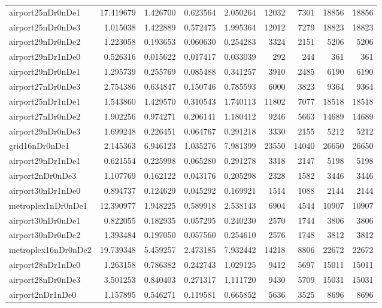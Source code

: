 \begin{longtable}{|l|r|r|r|r|r|r|r|r|}
airport25nDr0nDe1 & 17.419679 & 1.426700 & 0.623564 & 2.050264 & 12032 & 7301 & 18856 & 18856 \\
airport25nDr0nDe3 & 1.015038 & 1.422889 & 0.572475 & 1.995364 & 12012 & 7279 & 18823 & 18823 \\
airport29nDr0nDe2 & 1.223058 & 0.193653 & 0.060630 & 0.254283 & 3324 & 2151 & 5206 & 5206 \\
airport29nDr1nDe0 & 0.526316 & 0.015622 & 0.017417 & 0.033039 & 292 & 244 & 361 & 361 \\
airport29nDr0nDe1 & 1.295739 & 0.255769 & 0.085488 & 0.341257 & 3910 & 2485 & 6190 & 6190 \\
airport27nDr0nDe3 & 2.754386 & 0.634847 & 0.150746 & 0.785593 & 6000 & 3823 & 9364 & 9364 \\
airport25nDr1nDe1 & 1.543860 & 1.429570 & 0.310543 & 1.740113 & 11802 & 7077 & 18518 & 18518 \\
airport27nDr0nDe2 & 1.902256 & 0.974271 & 0.206141 & 1.180412 & 9246 & 5663 & 14689 & 14689 \\
airport29nDr0nDe3 & 1.699248 & 0.226451 & 0.064767 & 0.291218 & 3330 & 2155 & 5212 & 5212 \\
grid16nDr0nDe1 & 2.145363 & 6.946123 & 1.035276 & 7.981399 & 23550 & 14040 & 26650 & 26650 \\
airport29nDr1nDe1 & 0.621554 & 0.225998 & 0.065280 & 0.291278 & 3318 & 2147 & 5198 & 5198 \\
airport2nDr0nDe3 & 1.107769 & 0.162122 & 0.043176 & 0.205298 & 2328 & 1582 & 3446 & 3446 \\
airport30nDr1nDe0 & 0.894737 & 0.124629 & 0.045292 & 0.169921 & 1514 & 1088 & 2144 & 2144 \\
metroplex1nDr0nDe1 & 12.390977 & 1.948225 & 0.589918 & 2.538143 & 6904 & 4544 & 10907 & 10907 \\
airport30nDr0nDe1 & 0.822055 & 0.182935 & 0.057295 & 0.240230 & 2570 & 1744 & 3806 & 3806 \\
airport30nDr0nDe2 & 1.393484 & 0.197050 & 0.057560 & 0.254610 & 2576 & 1748 & 3812 & 3812 \\
metroplex16nDr0nDe2 & 19.739348 & 5.459257 & 2.473185 & 7.932442 & 14218 & 8806 & 22672 & 22672 \\
airport28nDr1nDe0 & 1.263158 & 0.786382 & 0.242743 & 1.029125 & 9412 & 5697 & 15011 & 15011 \\
airport28nDr0nDe3 & 3.501253 & 0.840403 & 0.271317 & 1.111720 & 9430 & 5709 & 15031 & 15031 \\
airport2nDr1nDe0 & 1.157895 & 0.546271 & 0.119581 & 0.665852 & 5636 & 3525 & 8696 & 8696 \\

\end{longtable}
